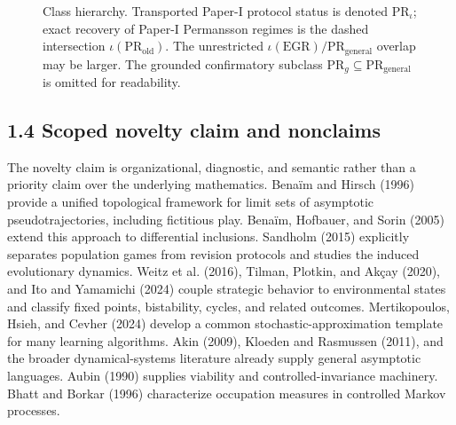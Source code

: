\documentclass[10pt]{article}
\begin{document}
\begin{figure}[htbp]
\centering
{}
\caption{Class hierarchy. Transported Paper-I protocol status is denoted $\mathrm{PR}_{\iota}$; exact recovery of Paper-I Permansson regimes is the dashed intersection $\iota(\mathrm{PR}_{\mathrm{old}})$. The unrestricted $\iota(\mathrm{EGR})/\mathrm{PR}_{\mathrm{general}}$ overlap may be larger. The grounded confirmatory subclass $\mathrm{PR}_g\subseteq\mathrm{PR}_{\mathrm{general}}$ is omitted for readability.}
\label{fig:class-hierarchy}
\end{figure}

\subsection{1.4 Scoped novelty claim and
nonclaims}\label{scoped-novelty-claim-and-nonclaims}

The novelty claim is organizational, diagnostic, and semantic rather
than a priority claim over the underlying mathematics. Benaïm and Hirsch
(1996) provide a unified topological framework for limit sets of
asymptotic pseudotrajectories, including fictitious play. Benaïm,
Hofbauer, and Sorin (2005) extend this approach to differential
inclusions. Sandholm (2015) explicitly separates population games from
revision protocols and studies the induced evolutionary dynamics. Weitz
et al. (2016), Tilman, Plotkin, and Akçay (2020), and Ito and Yamamichi
(2024) couple strategic behavior to environmental states and classify
fixed points, bistability, cycles, and related outcomes. Mertikopoulos,
Hsieh, and Cevher (2024) develop a common stochastic-approximation
template for many learning algorithms. Akin (2009), Kloeden and
Rasmussen (2011), and the broader dynamical-systems literature already
supply general asymptotic languages. Aubin (1990) supplies viability and
controlled-invariance machinery. Bhatt and Borkar (1996) characterize
occupation measures in controlled Markov processes.
\end{document}
